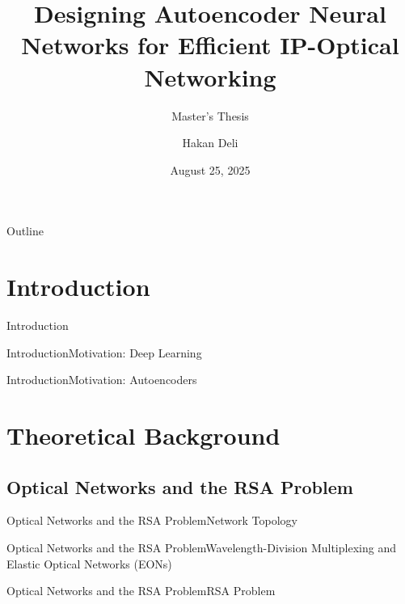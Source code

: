 \documentclass[english,american,german,aspectratio=169]{beamer}
\title{Designing Autoencoder Neural Networks for Efficient IP-Optical Networking}
\subtitle{Master's Thesis}
\date{August 25, 2025} %
\author{Hakan Deli}
\begin{document}
\begin{frame}[plain]{Outline}
    \vspace{0.4cm}
    \begin{minipage}[t][1cm][t]{\linewidth}
        \setlength{\itemsep}{0cm}
        \setlength{\parskip}{3pt} 
        \tableofcontents[sectionstyle=show,subsectionstyle=show,subsubsectionstyle=hide]
    \end{minipage}
\end{frame}

\breadcrumbson

\section{Introduction}

\begin{frame}{Introduction}{}
   
\end{frame}


\begin{frame}{Introduction}{Motivation: Deep Learning}
    
\end{frame}


\begin{frame}{Introduction}{Motivation: Autoencoders}
    
\end{frame}


\section{Theoretical Background}


\subsection{Optical Networks and the RSA Problem}

\begin{frame}{Optical Networks and the RSA Problem}{Network Topology}
    
\end{frame}

\begin{frame}{Optical Networks and the RSA Problem}{Wavelength-Division Multiplexing and Elastic Optical Networks (EONs)}
	
\end{frame}

\begin{frame}{Optical Networks and the RSA Problem}{RSA Problem}
	
\end{frame}
\end{document}

